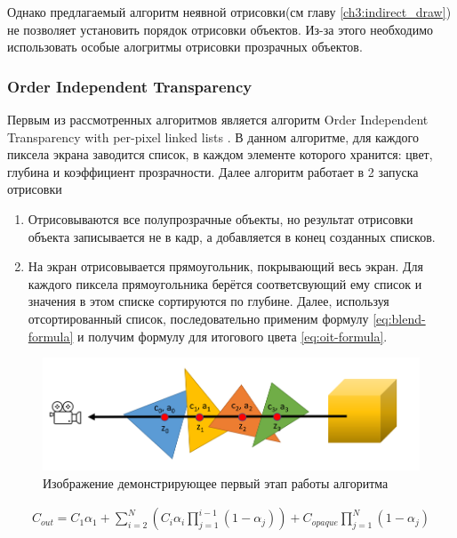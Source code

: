 		Однако предлагаемый алгоритм неявной отрисовки(см главу \ref{ch3:indirect_draw}) не позволяет установить порядок отрисовки объектов. Из-за этого необходимо использовать особые алогритмы отрисовки прозрачных объектов.		
		
		\subsubsection{Order Independent Transparency} \label{ch3:render_pass:transparents:oit}
			Первым из рассмотренных алгоритмов является алгоритм Order Independent Transparency with per-pixel linked lists \cite{barta2011order}. В данном алгоритме, для каждого пиксела экрана заводится список, в каждом элементе которого хранится: цвет, глубина и коэффициент прозрачности. Далее алгоритм работает в 2 запуска отрисовки
			
			\begin{enumerate}[1.]
				\item Отрисовываются все полупрозрачные объекты, но результат отрисовки объекта записывается не в кадр, а добавляется в конец созданных списков.
				\item На экран отрисовывается прямоугольник, покрывающий весь экран. Для каждого пиксела прямоугольника берётся соответсвующий ему список и значения в этом списке сортируются по глубине. Далее, используя отсортированный список, последовательно применим формулу \ref{eq:blend-formula} и получим формулу для итогового цвета \ref{eq:oit-formula}.
			\end{enumerate}
			
			\begin{figure}[ht!] 
				\center
				\includegraphics [scale=0.5] {my_folder/images//first_step_oit}	
				\caption{Изображение демонстрирующее первый этап работы алгоритма} 
				\label{fig:first_step_oit}
			\end{figure}
			 
			\begin{equation}
				\label{eq:oit-formula}
				\begin{multlined}	 
			 		C_{out} = C_{1}\alpha_1 + \sum_{i=2}^{N}(C_i\alpha_i\prod _{j=1}^{i - 1}(1 - \alpha_j)) + 
			 		C_{opaque}\prod _{j=1}^{N}(1 - \alpha_j)   
			 	\end{multlined}
			 \end{equation}
			
